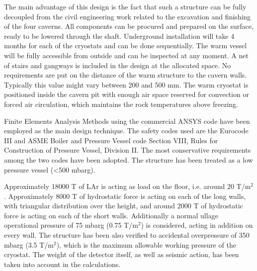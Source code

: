 The main advantage of this design is the fact that such a structure 
can be fully decoupled from the civil engineering work related to
the excavation and finishing of the four caverns. All components 
can be procured and prepared on the surface, ready to be lowered 
through the shaft. Underground installation will take 4 
months for each of the cryostats and can be done sequentially.  
The warm vessel will be fully accessible from outside and can be 
inspected at any moment. A net of stairs and gangways is included 
in the design at the allocated space. No requirements are put on 
the distance of the warm structure to the cavern walls. Typically
 this value might vary between 200 and 500 mm. The warm cryostat 
is positioned inside the cavern pit with enough air space 
reserved for convection or forced air circulation, which maintains 
the rock temperatures above freezing.

Finite Elements Analysis Methods using the commercial ANSYS code 
have been employed as the main design technique. The safety codes 
used are the Eurocode III and ASME Boiler and Pressure Vessel code 
Section VIII, Rules for Construction of Pressure Vessel, 
Division II. The most conservative requirements among the two 
codes have been adopted. The structure has been treated as a 
low pressure vessel (<500 mbarg). 

Approximately 18000 T of LAr is acting as load on the floor, i.e. 
around 20 T/m$^{2}$. Approximately 8000 T of hydrostatic force is acting 
on each of the long walls, with triangular distribution over the 
height, and around 2000 T of hydrostatic force is acting on each 
of the short walls.  Additionally a normal ullage operational pressure 
of 75 mbarg (0.75 T/m$^{2}$) is considered, acting in addition on every 
wall. The structure has been also verified to accidental overpressure 
of 350 mbarg (3.5 T/m$^{2}$), which is the maximum allowable working pressure 
of the cryostat.  The weight of the detector itself, as well as 
seismic action, has been taken into account in the calculations.

